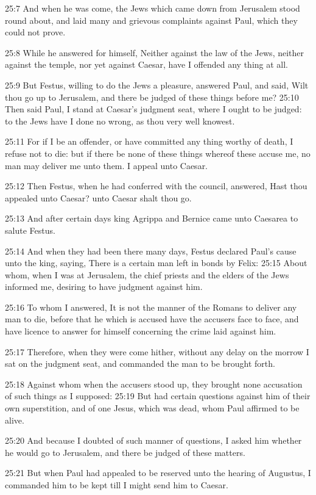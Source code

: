 25:7 And when he was come, the Jews which came down from Jerusalem stood round about, and laid many and grievous complaints against Paul, which they could not prove.

25:8 While he answered for himself, Neither against the law of the Jews, neither against the temple, nor yet against Caesar, have I offended any thing at all.

25:9 But Festus, willing to do the Jews a pleasure, answered Paul, and said, Wilt thou go up to Jerusalem, and there be judged of these things before me?  25:10 Then said Paul, I stand at Caesar's judgment seat, where I ought to be judged: to the Jews have I done no wrong, as thou very well knowest.

25:11 For if I be an offender, or have committed any thing worthy of death, I refuse not to die: but if there be none of these things whereof these accuse me, no man may deliver me unto them. I appeal unto Caesar.

25:12 Then Festus, when he had conferred with the council, answered, Hast thou appealed unto Caesar? unto Caesar shalt thou go.

25:13 And after certain days king Agrippa and Bernice came unto Caesarea to salute Festus.

25:14 And when they had been there many days, Festus declared Paul's cause unto the king, saying, There is a certain man left in bonds by Felix: 25:15 About whom, when I was at Jerusalem, the chief priests and the elders of the Jews informed me, desiring to have judgment against him.

25:16 To whom I answered, It is not the manner of the Romans to deliver any man to die, before that he which is accused have the accusers face to face, and have licence to answer for himself concerning the crime laid against him.

25:17 Therefore, when they were come hither, without any delay on the morrow I sat on the judgment seat, and commanded the man to be brought forth.

25:18 Against whom when the accusers stood up, they brought none accusation of such things as I supposed: 25:19 But had certain questions against him of their own superstition, and of one Jesus, which was dead, whom Paul affirmed to be alive.

25:20 And because I doubted of such manner of questions, I asked him whether he would go to Jerusalem, and there be judged of these matters.

25:21 But when Paul had appealed to be reserved unto the hearing of Augustus, I commanded him to be kept till I might send him to Caesar.

